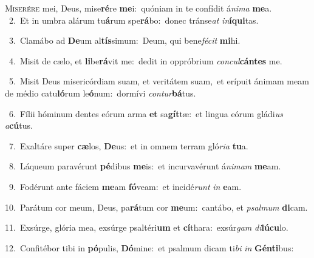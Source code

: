 \lettrine{\initial\textcolor{\initialcolor}{M}}{iserére} mei, Deus, mise\-\textbf{ré}\-re \textbf{me}\-i:~\star quóniam in te confídit á\-\textit{ni}\-\textit{ma} \textbf{me}\-a.\\
{\numbfont\textcolor{\numbcolor}{~2.}}~Et in umbra alárum tu\-\textbf{á}\-rum spe\-\textbf{rá}\-bo:~\star donec tránse\textit{at} \textit{in}\-\textbf{í}\textbf{qui}tas.\par
{\numbfont\textcolor{\numbcolor}{~3.}}~Clamábo ad \textbf{De}\-um al\-\textbf{tís}\-simum:~\star Deum, qui bene\-\textit{fé}\-\textit{cit} \textbf{mi}\-hi.\par
{\numbfont\textcolor{\numbcolor}{~4.}}~Misit de cælo, et \textbf{li}\-be\-\textbf{rá}\-vit me:~\star dedit in oppróbrium \textit{con}\-\textit{cul}\textbf{cán}\textbf{tes} me.\par
{\numbfont\textcolor{\numbcolor}{~5.}}~Misit Deus misericórdiam suam, et veritátem suam,~\dagger et erípuit ánimam meam de médio catu\-\textbf{ló}\-rum le\-\textbf{ó}\-num:~\star dormívi \textit{con}\-\textit{tur}\textbf{bá}tus.\par
{\numbfont\textcolor{\numbcolor}{~6.}}~Fílii hóminum dentes eórum arma \textbf{et} sa\-\textbf{gít}\-tæ:~\star et lingua eórum gládi\textit{us} \textit{a}\-\textbf{cú}tus.\par
{\numbfont\textcolor{\numbcolor}{~7.}}~Exaltáre super \textbf{cæ}\-los, \textbf{De}\-us:~\star et in omnem terram gló\-\textit{ri}\-\textit{a} \textbf{tu}\-a.\par
{\numbfont\textcolor{\numbcolor}{~8.}}~Láqueum paravérunt \textbf{pé}\-dibus \textbf{me}\-is:~\star et incurvavérunt á\-\textit{ni}\-\textit{mam} \textbf{me}\-am.\par
{\numbfont\textcolor{\numbcolor}{~9.}}~Fodérunt ante fáciem \textbf{me}\-am \textbf{fó}\-veam:~\star et incidé\textit{runt} \textit{in} \textbf{e}\-am.\par
{\numbfont\textcolor{\numbcolor}{10.}}~Parátum cor meum, Deus, pa\-\textbf{rá}\-tum cor \textbf{me}\-um:~\star cantábo, et \textit{psal}\-\textit{mum} \textbf{di}\-cam.\par
{\numbfont\textcolor{\numbcolor}{11.}}~Exsúrge, glória mea, exsúrge psaltéri\textbf{um} et \textbf{cí}\-thara:~\star exsúr\textit{gam} \textit{di}\-\textbf{lú}\textbf{cu}lo.\par
{\numbfont\textcolor{\numbcolor}{12.}}~Confitébor tibi in \textbf{pó}\-pulis, \textbf{Dó}\-mine:~\star et psalmum dicam ti\textit{bi} \textit{in} \textbf{Gén}\-\textbf{ti}bus:\par
